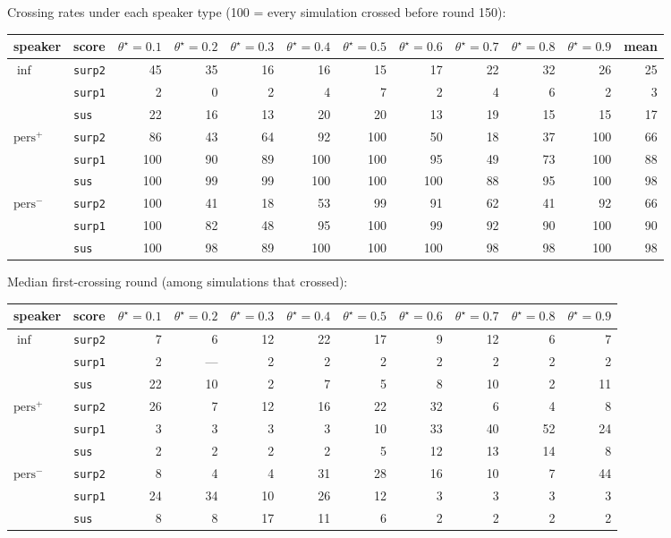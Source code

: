 \documentclass[11pt]{article}
\newcommand{\pers}{\mathrm{pers}}
\begin{document}
Crossing rates under each speaker type (100 = every simulation crossed
before round 150):

\begin{center}
\begin{tabular}{llrrrrrrrrrr}
\toprule
speaker & score & $\theta^\star=0.1$ & $\theta^\star=0.2$ & $\theta^\star=0.3$ & $\theta^\star=0.4$ & $\theta^\star=0.5$ & $\theta^\star=0.6$ & $\theta^\star=0.7$ & $\theta^\star=0.8$ & $\theta^\star=0.9$ & mean \\
\midrule
$\inf$ & \texttt{surp2} & 45 & 35 & 16 & 16 & 15 & 17 & 22 & 32 & 26 & 25 \\
 & \texttt{surp1} & 2 & 0 & 2 & 4 & 7 & 2 & 4 & 6 & 2 & 3 \\
 & \texttt{sus} & 22 & 16 & 13 & 20 & 20 & 13 & 19 & 15 & 15 & 17 \\
\midrule
$\pers^{+}$ & \texttt{surp2} & 86 & 43 & 64 & 92 & 100 & 50 & 18 & 37 & 100 & 66 \\
 & \texttt{surp1} & 100 & 90 & 89 & 100 & 100 & 95 & 49 & 73 & 100 & 88 \\
 & \texttt{sus} & 100 & 99 & 99 & 100 & 100 & 100 & 88 & 95 & 100 & 98 \\
\midrule
$\pers^{-}$ & \texttt{surp2} & 100 & 41 & 18 & 53 & 99 & 91 & 62 & 41 & 92 & 66 \\
 & \texttt{surp1} & 100 & 82 & 48 & 95 & 100 & 99 & 92 & 90 & 100 & 90 \\
 & \texttt{sus} & 100 & 98 & 89 & 100 & 100 & 100 & 98 & 98 & 100 & 98 \\
\bottomrule
\end{tabular}
\end{center}

Median first-crossing round (among simulations that crossed):

\begin{center}
\begin{tabular}{llrrrrrrrrr}
\toprule
speaker & score & $\theta^\star=0.1$ & $\theta^\star=0.2$ & $\theta^\star=0.3$ & $\theta^\star=0.4$ & $\theta^\star=0.5$ & $\theta^\star=0.6$ & $\theta^\star=0.7$ & $\theta^\star=0.8$ & $\theta^\star=0.9$ \\
\midrule
$\inf$ & \texttt{surp2} & 7 & 6 & 12 & 22 & 17 & 9 & 12 & 6 & 7 \\
 & \texttt{surp1} & 2 & --- & 2 & 2 & 2 & 2 & 2 & 2 & 2 \\
 & \texttt{sus} & 22 & 10 & 2 & 7 & 5 & 8 & 10 & 2 & 11 \\
\midrule
$\pers^{+}$ & \texttt{surp2} & 26 & 7 & 12 & 16 & 22 & 32 & 6 & 4 & 8 \\
 & \texttt{surp1} & 3 & 3 & 3 & 3 & 10 & 33 & 40 & 52 & 24 \\
 & \texttt{sus} & 2 & 2 & 2 & 2 & 5 & 12 & 13 & 14 & 8 \\
\midrule
$\pers^{-}$ & \texttt{surp2} & 8 & 4 & 4 & 31 & 28 & 16 & 10 & 7 & 44 \\
 & \texttt{surp1} & 24 & 34 & 10 & 26 & 12 & 3 & 3 & 3 & 3 \\
 & \texttt{sus} & 8 & 8 & 17 & 11 & 6 & 2 & 2 & 2 & 2 \\
\bottomrule
\end{tabular}
\end{center}
\end{document}
